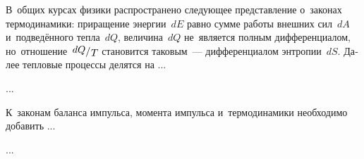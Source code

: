 

\begin{otherlanguage}{russian}

В~общих курсах физики распространено следующее представление о~законах термодинамики: приращение энергии~$dE$ равно сумме работы внешних сил~$dA$ и~подведённого тепла~$dQ$, величина~$dQ$ не~является полным дифференциалом, но~отношение~${\raisemath{.16em}{dQ}/\hspace{.1ex}\raisemath{-0.16em}{T}}$ становится таковым~--- дифференциалом энтропии~$dS$. Далее тепловые процессы делятся на ...

...



\end{otherlanguage}



\begin{otherlanguage}{russian}

К~законам баланса импульса, момента импульса и~термодинамики необходимо добавить ...

...



\end{otherlanguage}



